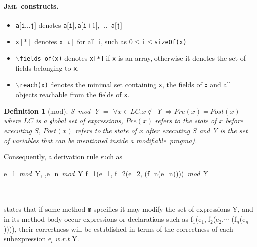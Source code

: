 \documentclass[a4paper]{llncs}
\newcommand{\jml}{\textsc{Jml}}
\newcommand{\modif}{\textit{modifiable}}
\newtheorem {df}{Definition}
\begin{document}
\paragraph{\bf \jml~constructs.}
\begin{itemize} %
\item{\texttt{a$[$i$\dots$j$]$}} denotes \texttt{a$[$i$],$a$[$i$+1],\
\dots$ a$[$j$]$}

\item{\texttt{x$[*]$}} denotes \texttt{x$[i]$} for all \texttt{i},
such as $0\leq$\texttt{i}$\le$\texttt{sizeOf(x)}

\item{\texttt{$\backslash$fields\_of(x)}} denotes \texttt{x[*]} if
\texttt{x} is an array, otherwise it denotes the set of fields
belonging to \texttt{x}.

\item{\texttt{$\backslash$reach(x)}} denotes the minimal set
containing \texttt{x}, the fields of \texttt{x} and all objects
reachable from the fields of \texttt{x}.
\end{itemize} %
\begin{df}[mod] %
\label{df-mod}
\textup{S}\ \textit{mod}\ \textsc{Y} $=$ $\forall x \in LC.
x\not\in$ \textsc{Y}$\ \Rightarrow Pre(x) = Post(x)$ \\
where $LC$ is a global set of expressions, $Pre(x)$
refers to the state of $x$ before executing $S$,
$Post(x)$ refers to the state of $x$ after executing
$S$ and \textsc{Y} is the set of variables that can be mentioned
inside a \modif~pragma).
\end{df} %
Consequently, a derivation rule such as \\
\begin{prooftree}
\rule[1ex]{0em}{1.5ex}
\textup{e}_1\ \textit{mod}\ \textsc{Y}, \cdots ,\textup{e}_n\ \textit{mod}\ \textsc{Y}
\justifies
\textup{f}_1\textup{(e}_1\textup{, f}_2\textup{(e}_2\textup{,}\cdots
\textup{(f}_n\textup{(e}_n\textup{))))}\ \textit{mod}\ \textsc{Y} 
\end{prooftree}\\ \\
states that if some method \texttt{m} specifies it may modify the set
of expressions \textsc{Y}, and in its method body occur expressions or
declarations such as \textup{f}$_1$\textup{(e}$_1$\textup{,
f}$_2$\textup{(e}$_2$\textup{,}$\cdots$
\textup{(f}$_n$\textup{(e}$_n$\textup{))))}, their correctness will be
established in terms of the correctness of each subexpression
\textup{e}$_i$ \emph{w.r.t} \textsc{Y}. 
\end{document}
